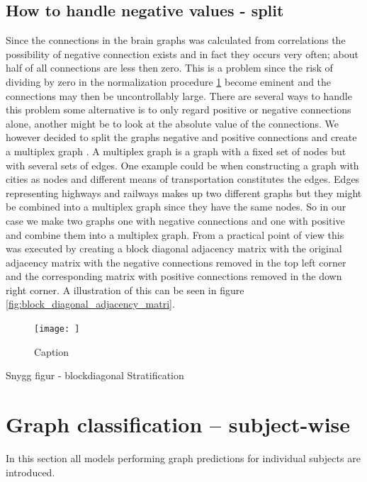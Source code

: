\subsection{How to handle negative values - split}
Since the connections in the brain graphs was calculated from correlations the possibility of negative connection exists and in fact they occurs very often; about half of all connections are less then zero. This is a problem since the risk of dividing by zero in the normalization procedure \ref{} become eminent and the connections may then be uncontrollably large. There are several ways to handle this problem some alternative is to only regard positive or negative connections alone, another might be to look at the absolute value of the connections. We however decided to split the graphs negative and positive connections and create a multiplex graph \cite{}. A multiplex graph is a graph with a fixed set of nodes but with several sets of edges. One example could be when constructing a graph with cities as nodes and different means of transportation constitutes the edges. Edges representing highways and railways makes up two different graphs but they might be combined into a multiplex graph since they have the same nodes. So in our case we make two graphs one with negative connections and one with positive and combine them into a multiplex graph. From a practical point of view this was executed by creating a block diagonal adjacency matrix with the original adjacency matrix with the negative connections removed in the top left corner and the corresponding matrix with positive connections removed in the down right corner. A illustration of this can be seen in figure \ref{fig:block_diagonal_adjacency_matri}.

\begin{figure}
    \centering
    \texttt{[image: ]}
    \caption{Caption}
    \label{fig:block_diagonal_adjacency_matrix}
\end{figure}

Snygg figur - blockdiagonal
Stratification

\section{Graph classification -- subject-wise}
In this section all models performing graph predictions for individual subjects are introduced.

